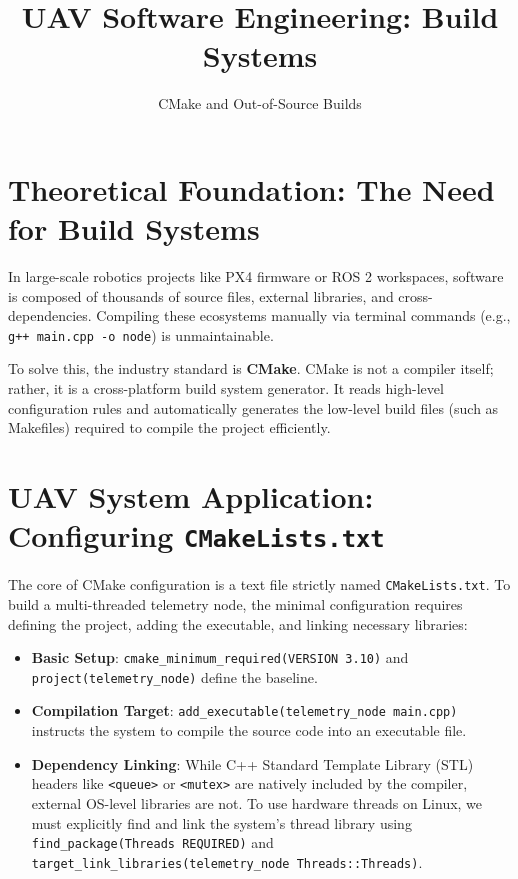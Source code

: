 \documentclass{article}
\title{UAV Software Engineering: Build Systems}
\author{CMake and Out-of-Source Builds}
\date{}
\begin{document}
\maketitle

\section{Theoretical Foundation: The Need for Build Systems}
In large-scale robotics projects like PX4 firmware or ROS 2 workspaces, software is composed of thousands of source files, 
external libraries, and cross-dependencies. Compiling these ecosystems manually via terminal commands (e.g., \texttt{g++ main.cpp -o node}) 
is unmaintainable. 

To solve this, the industry standard is \textbf{CMake}. 
CMake is not a compiler itself; rather, it is a cross-platform build system generator. 
It reads high-level configuration rules and automatically generates the low-level build files (such as Makefiles) 
required to compile the project efficiently.

\section{UAV System Application: Configuring \texttt{CMakeLists.txt}}
The core of CMake configuration is a text file strictly named \texttt{CMakeLists.txt}. 
To build a multi-threaded telemetry node, the minimal configuration requires defining the project, adding the executable, and linking necessary libraries:

\begin{itemize}
    \item \textbf{Basic Setup}: \texttt{cmake\_minimum\_required(VERSION 3.10)} and \texttt{project(telemetry\_node)} define the baseline.
    \item \textbf{Compilation Target}: \texttt{add\_executable(telemetry\_node main.cpp)} instructs the system to compile the source code into an executable file.
    \item \textbf{Dependency Linking}: While C++ Standard Template Library (STL) headers like \texttt{<queue>} or \texttt{<mutex>} 
    are natively included by the compiler, external OS-level libraries are not. To use hardware threads on Linux, we must explicitly 
    find and link the system's thread library using \texttt{find\_package(Threads REQUIRED)} and 
    \texttt{target\_link\_libraries(telemetry\_node Threads::Threads)}.
\end{itemize}
\end{document}
